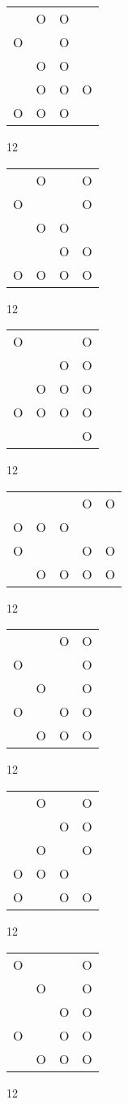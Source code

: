 \begin{tabular}{|m{0.2cm}m{0.2cm}m{0.2cm}m{0.2cm}|}\hline
 &O&O& \\
O& &O& \\
 &O&O& \\
 &O&O&O\\
O&O&O& \\
\hline\end{tabular}12
\begin{tabular}{|m{0.2cm}m{0.2cm}m{0.2cm}m{0.2cm}|}\hline
 &O& &O\\
O& & &O\\
 &O&O& \\
 & &O&O\\
O&O&O&O\\
\hline\end{tabular}12
\begin{tabular}{|m{0.2cm}m{0.2cm}m{0.2cm}m{0.2cm}|}\hline
O& & &O\\
 & &O&O\\
 &O&O&O\\
O&O&O&O\\
 & & &O\\
\hline\end{tabular}12
\begin{tabular}{|m{0.2cm}m{0.2cm}m{0.2cm}m{0.2cm}m{0.2cm}|}\hline
 & & &O&O\\
O&O&O& & \\
O& & &O&O\\
 &O&O&O&O\\
\hline\end{tabular}12
\begin{tabular}{|m{0.2cm}m{0.2cm}m{0.2cm}m{0.2cm}|}\hline
 & &O&O\\
O& & &O\\
 &O& &O\\
O& &O&O\\
 &O&O&O\\
\hline\end{tabular}12
\begin{tabular}{|m{0.2cm}m{0.2cm}m{0.2cm}m{0.2cm}|}\hline
 &O& &O\\
 & &O&O\\
 &O& &O\\
O&O&O& \\
O& &O&O\\
\hline\end{tabular}12
\begin{tabular}{|m{0.2cm}m{0.2cm}m{0.2cm}m{0.2cm}|}\hline
O& & &O\\
 &O& &O\\
 & &O&O\\
O& &O&O\\
 &O&O&O\\
\hline\end{tabular}12
